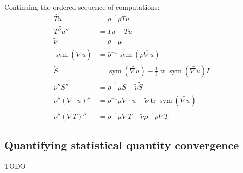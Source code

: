 \documentclass[letterpaper,11pt,nointlimits,reqno,draft]{amsart}
\newcommand{\Mach}[1][]{\ensuremath{\mbox{Ma}_{#1}}}
\newcommand{\symmetricpart}[1]
  {\ensuremath{\operatorname{sym}\left(#1\right)}}
\DeclareMathOperator{\trace}{tr}
\begin{document}
Continuing the ordered sequence of computations:
\begin{align}
  \widetilde{Tu} &= \bar{\rho}^{-1} \overline{\rho{}Tu}
\\
  \widetilde{T''u''} &= \widetilde{Tu} - \tilde{T}\tilde{u}
\\
  \tilde{\nu} &= \bar{\rho}^{-1} \overline{\mu}
\\
  \symmetricpart{\widetilde{\nabla{}u}}
  &= \bar{\rho}^{-1} \symmetricpart{\overline{\rho\nabla{}u}}
\\
  \tilde{S} &= \symmetricpart{\widetilde{\nabla{}u}}
   - \frac{1}{3} \trace\symmetricpart{\widetilde{\nabla{}u}} I
\\
  \widetilde{\nu''S''}
  &= \bar{\rho}^{-1} \overline{\mu{}S} - \tilde{\nu}\tilde{S}
\\
  \widetilde{\nu''\left(\nabla\cdot{}u\right)''}
  &= \bar{\rho}^{-1} \overline{\mu\nabla\cdot{}u}
   - \tilde{\nu}\trace\symmetricpart{\widetilde{\nabla{}u}}
\\
  \widetilde{\nu''\left(\nabla{}T\right)''}
  &= \bar{\rho}^{-1} \overline{\mu\nabla{}T}
   - \tilde{\nu} \bar{\rho}^{-1} \overline{\rho\nabla{}T}
\end{align}

\subsection{Quantifying statistical quantity convergence}
\label{sec:quantconvergence}

TODO






\end{document}
